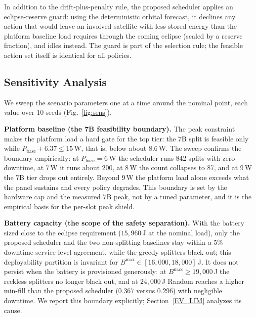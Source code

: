 
\begin{remark}\label{rem_reserve}
In addition to the drift-plus-penalty rule, the proposed scheduler applies an
eclipse-reserve guard: using the deterministic orbital forecast, it declines any
action that would leave an involved satellite with less stored energy than the
platform baseline load requires through the coming eclipse (scaled by a reserve
fraction), and idles instead. The guard is part of the selection rule; the
feasible action set itself is identical for all policies.
\end{remark}

\subsection{Sensitivity Analysis}\label{EV_SENS}
We sweep the scenario parameters one at a time around the nominal point, each
value over 10 seeds (Fig.~\ref{fig:sens}).

\textbf{Platform baseline (the 7B feasibility boundary).} The peak constraint
makes the platform load a hard gate for the top tier: the 7B split is feasible
only while $P_{\text{base}} + 6.37 \le 15$\,W, that is, below about 8.6\,W. The
sweep confirms the boundary empirically: at $P_{\text{base}}{=}6$\,W the
scheduler runs 842 splits with zero downtime, at 7\,W it runs about 200, at
8\,W the count collapses to 87, and at 9\,W the 7B tier drops out entirely.
Beyond 9\,W the platform load alone exceeds what the panel sustains and every
policy degrades. This boundary is set by the hardware cap and the measured 7B
peak, not by a tuned parameter, and it is the empirical basis for the per-slot
peak shield.

\textbf{Battery capacity (the scope of the safety separation).} With the
battery sized close to the eclipse requirement ($15{,}960$\,J at the nominal
load), only the proposed scheduler and the two non-splitting baselines stay
within a 5\% downtime service-level agreement, while the greedy splitters
black out; this deployability partition is invariant for
$B^{\max}\!\in\![16{,}000, 18{,}000]$\,J. It does not persist when the battery
is provisioned generously: at $B^{\max}\!\ge\!19{,}000$\,J the reckless
splitters no longer black out, and at $24{,}000$\,J Random reaches a higher
min-fill than the proposed scheduler (0.367 versus 0.296) with negligible
downtime. We report this boundary explicitly; Section~\ref{EV_LIM} analyzes
its cause.

